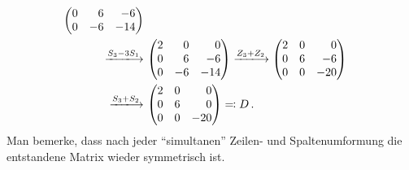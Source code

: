 \begin{align*}
\begin{pmatrix*}[r]
    0 &  6  &  -6 \\
    0 & -6  & -14 \\
  \end{pmatrix*}
  \\
  \xlongrightarrow{S_3 - 3 S_1}&\,
  \begin{pmatrix*}[r]
    2 &  0  &   0 \\ 
    0 &  6  &  -6 \\
    0 & -6  & -14 \\
  \end{pmatrix*}
  \xlongrightarrow{Z_3 + Z_2}
  \begin{pmatrix*}[r]
    2 & 0 &   0 \\ 
    0 & 6 &  -6 \\
    0 & 0 & -20 \\
  \end{pmatrix*}
  \\
  \xlongrightarrow{S_3 + S_2}&\,
  \begin{pmatrix*}[r]
    2 & 0 &   0 \\ 
    0 & 6 &   0 \\
    0 & 0 & -20 \\
  \end{pmatrix*}
  \eqqcolon
  D \,.
\end{align*}
Man bemerke, dass nach jeder \enquote{simultanen} Zeilen- und Spaltenumformung die entstandene Matrix wieder symmetrisch ist.

